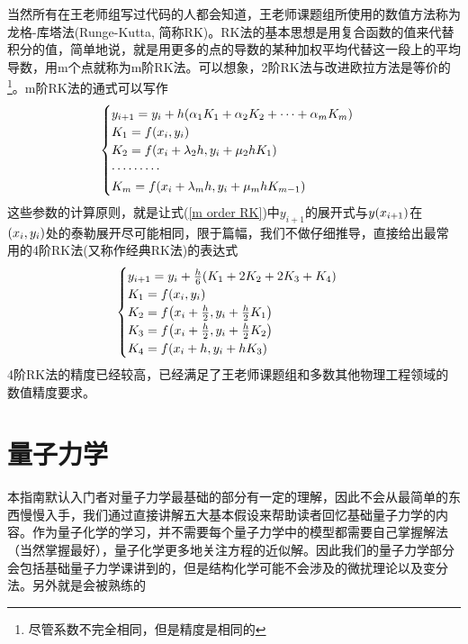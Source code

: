 \documentclass[12pt,a4paper,openany,twoside]{book}
\numberwithin{equation}{section}
\begin{document}
          当然所有在王老师组写过代码的人都会知道，王老师课题组所使用的数值方法称为龙格-库塔法(Runge-Kutta, 简称RK)。RK法的基本思想是用复合函数的值来代替积分的值，简单地说，就是用更多的点的导数的某种加权平均代替这一段上的平均导数，用m个点就称为m阶RK法。可以想象，2阶RK法与改进欧拉方法是等价的\footnote{尽管系数不完全相同，但是精度是相同的}。m阶RK法的通式可以写作
          \begin{equation}
            \begin{cases}
              y_{i+1}=y_i+h\qty(\alpha_1 K_1+\alpha_2 K_2+\cdots+\alpha_m K_m)\\
              K_1=f\qty(x_i, y_i)\\
              K_2=f\qty(x_i+\lambda_2 h, y_i+\mu_2 h K_1)\\
              \cdots\cdots\cdots\\
              K_m=f\qty(x_i+\lambda_m h, y_i+\mu_m h K_{m-1})
            \end{cases}
            \label{m order RK}
          \end{equation}
          这些参数的计算原则，就是让式(\ref{m order RK})中$y_{i+1}$的展开式与$y\qty(x_{i+1})$在$\qty(x_i,y_i)$处的泰勒展开尽可能相同，限于篇幅，我们不做仔细推导，直接给出最常用的4阶RK法(又称作经典RK法)的表达式
          \begin{equation}
            \begin{cases}
              y_{i+1}=y_i+\frac{h}{6}\qty(K_1+2K_2+2K_3+K_4)\\
              K_1=f\qty(x_i,y_i)\\
              K_2=f\qty(x_i+\frac{h}{2},y_i+\frac{h}{2}K_1) \\
              K_3=f\qty(x_i+\frac{h}{2},y_i+\frac{h}{2}K_2) \\
              K_4=f\qty(x_i+h, y_i+hK_3)
            \end{cases}
            \label{4 order RK}
          \end{equation}
          4阶RK法的精度已经较高，已经满足了王老师课题组和多数其他物理工程领域的数值精度要求。

    \chapter{量子力学}
      本指南默认入门者对量子力学最基础的部分有一定的理解，因此不会从最简单的东西慢慢入手，我们通过直接讲解五大基本假设来帮助读者回忆基础量子力学的内容。作为量子化学的学习，并不需要每个量子力学中的模型都需要自己掌握解法（当然掌握最好），量子化学更多地关注方程的近似解。因此我们的量子力学部分会包括基础量子力学课讲到的，但是结构化学可能不会涉及的微扰理论以及变分法。另外就是会被熟练的
      
\end{document}
